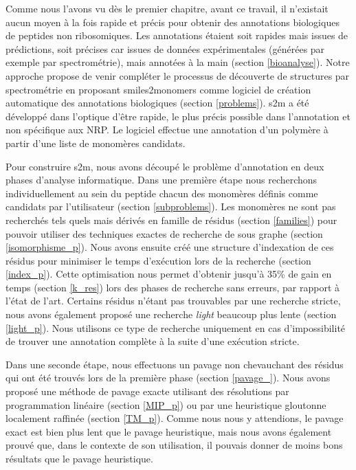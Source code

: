 Comme nous l'avons vu dès le premier chapitre, avant ce travail, il n'existait aucun moyen à la fois rapide et précis pour obtenir des annotations biologiques de peptides non ribosomiques.
Les annotations étaient soit rapides mais issues de prédictions, soit précises car issues de données expérimentales (générées par exemple par spectrométrie), mais annotées à la main (section \ref{bioanalyse}).
Notre approche propose de venir compléter le processus de découverte de structures par spectrométrie en proposant smiles2monomers comme logiciel de création automatique des annotations biologiques (section \ref{problems}).
s2m a été développé dans l'optique d'être rapide, le plus précis possible dans l'annotation et non spécifique aux NRP.
Le logiciel effectue une annotation d'un polymère à partir d'une liste de monomères candidats.

Pour construire s2m, nous avons découpé le problème d'annotation en deux phases d'analyse informatique.
Dans une première étape nous recherchons individuellement au sein du peptide chacun des monomères définis comme candidats par l'utilisateur (section \ref{subproblems}).
Les monomères ne sont pas recherchés tels quels mais dérivés en famille de résidus (section \ref{families}) pour pouvoir utiliser des techniques exactes de recherche de sous graphe (section \ref{isomorphisme_p}).
Nous avons ensuite créé une structure d'indexation de ces résidus pour minimiser le temps d'exécution lors de la recherche (section \ref{index_p}).
Cette optimisation nous permet d'obtenir jusqu'à 35\% de gain en temps (section \ref{k_res}) lors des phases de recherche sans erreurs, par rapport à l'état de l'art.
Certains résidus n'étant pas trouvables par une recherche stricte, nous avons également proposé une recherche \textit{light} beaucoup plus lente (section \ref{light_p}). Nous utilisons ce type de recherche uniquement en cas d'impossibilité de trouver une annotation complète à la suite d'une exécution stricte.

Dans une seconde étape, nous effectuons un pavage non chevauchant des résidus qui ont été trouvés lors de la première phase (section \ref{pavage_}).
Nous avons proposé une méthode de pavage exacte utilisant des résolutions par programmation linéaire (section \ref{MIP_p}) ou par une heuristique gloutonne localement raffinée (section \ref{TM_p}).
Comme nous nous y attendions, le pavage exact est bien plus lent que le pavage heuristique, mais nous avons également prouvé que, dans le contexte de son utilisation, il pouvais donner de moins bons résultats que le pavage heuristique.

